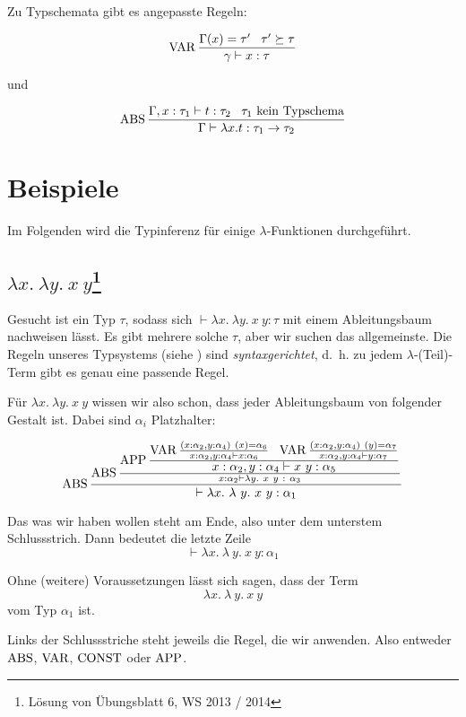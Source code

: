 Zu Typschemata gibt es angepasste Regeln:%

\[\operatorname{VAR} \frac{\Gamma(x)= \tau' \;\;\; \tau' \succeq \tau}{\gamma \vdash x: \tau}\]

und

\[\operatorname{ABS} \frac{\Gamma, x: \tau_1 \vdash t: \tau_2 \;\;\; \tau_1 \text{ kein Typschema}}{\Gamma \vdash  \lambda x. t: \tau_1 \rightarrow \tau_2}\]


\section{Beispiele}
Im Folgenden wird die Typinferenz für einige $\lambda$-Funktionen durchgeführt.

\subsection[$\lambda x.\ \lambda y.\ x\ y$]{$\lambda x.\ \lambda y.\ x\ y$\footnote{Lösung von Übungsblatt 6, WS 2013 / 2014}}
Gesucht ist ein Typ $\tau$, sodass sich $\vdash \lambda x.\ \lambda y.\ x\ y: \tau$
mit einem Ableitungsbaum nachweisen lässt. Es gibt mehrere solche $\tau$, aber
wir suchen das allgemeinste. Die Regeln unseres Typsystems (siehe ) 
sind \textit{syntaxgerichtet}, d.~h. zu jedem $\lambda$-(Teil)-Term gibt es genau
eine passende Regel.

Für $\lambda x.\ \lambda y.\ x\ y$ wissen wir also schon, dass jeder Ableitungsbaum
von folgender Gestalt ist. Dabei sind $\alpha_i$ Platzhalter:

\[\ABS \frac{\ABS\frac{\textstyle\APP \frac{\textstyle\VAR \frac{(x: \alpha_2, y: \alpha_4)\ (x) = \alpha_6}{x: \alpha_2, y: \alpha_4 \vdash x: \alpha_6}\ \ \VAR \frac{(x:\alpha_2, y: \alpha_4)\ (y) = \alpha_7}{x: \alpha_2, y: \alpha_4 \vdash y : \alpha_7}}{\textstyle x: \alpha_2, y: \alpha_4 \vdash x\ y: \alpha_5}}{x:\alpha_2 \vdash \lambda y.\ x\ y\ :\ \alpha_3}}{\vdash \lambda x.\ \lambda \ y.\ x\ y: \alpha_1}\]

Das was wir haben wollen steht am Ende, also unter dem unterstem Schlussstrich.
Dann bedeutet die letzte Zeile 
\[\vdash \lambda x.\ \lambda \ y.\ x\ y: \alpha_1\]

Ohne (weitere) Voraussetzungen lässt sich sagen, dass der Term
\[\lambda x.\ \lambda \ y.\ x\ y\]
vom Typ $\alpha_1$ ist.

Links der Schlussstriche steht jeweils die Regel, die wir anwenden. Also entweder
$\operatorname{ABS}$, $\operatorname{VAR}$, $\operatorname{CONST}$ oder $\operatorname{APP}$.

